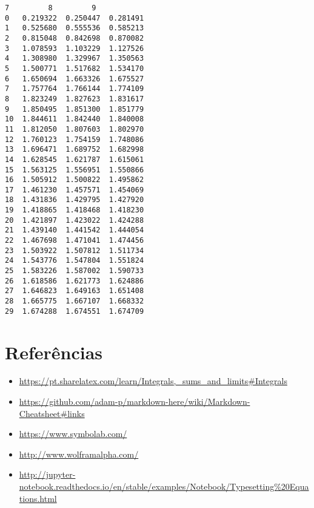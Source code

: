 \documentclass[11pt]{article}
\providecommand{\tightlist}{%
      \setlength{\itemsep}{0pt}\setlength{\parskip}{0pt}}
\begin{document}
\begin{Verbatim}[commandchars=\\\{\}]
           7         8         9  
0   0.219322  0.250447  0.281491  
1   0.525680  0.555536  0.585213  
2   0.815048  0.842698  0.870082  
3   1.078593  1.103229  1.127526  
4   1.308980  1.329967  1.350563  
5   1.500771  1.517682  1.534170  
6   1.650694  1.663326  1.675527  
7   1.757764  1.766144  1.774109  
8   1.823249  1.827623  1.831617  
9   1.850495  1.851300  1.851779  
10  1.844611  1.842440  1.840008  
11  1.812050  1.807603  1.802970  
12  1.760123  1.754159  1.748086  
13  1.696471  1.689752  1.682998  
14  1.628545  1.621787  1.615061  
15  1.563125  1.556951  1.550866  
16  1.505912  1.500822  1.495862  
17  1.461230  1.457571  1.454069  
18  1.431836  1.429795  1.427920  
19  1.418865  1.418468  1.418230  
20  1.421897  1.423022  1.424288  
21  1.439140  1.441542  1.444054  
22  1.467698  1.471041  1.474456  
23  1.503922  1.507812  1.511734  
24  1.543776  1.547804  1.551824  
25  1.583226  1.587002  1.590733  
26  1.618586  1.621773  1.624886  
27  1.646823  1.649163  1.651408  
28  1.665775  1.667107  1.668332  
29  1.674288  1.674551  1.674709  

    \end{Verbatim}

    \hypertarget{referuxeancias}{%
\section{Referências}\label{referuxeancias}}

    \begin{itemize}
\tightlist
\item
  \url{https://pt.sharelatex.com/learn/Integrals,_sums_and_limits\#Integrals}
\item
  \url{https://github.com/adam-p/markdown-here/wiki/Markdown-Cheatsheet\#links}
\item
  \url{https://www.symbolab.com/}
\item
  \url{http://www.wolframalpha.com/}
\item
  \url{http://jupyter-notebook.readthedocs.io/en/stable/examples/Notebook/Typesetting\%20Equations.html}
\end{itemize}


    
    
    
    
\end{document}
